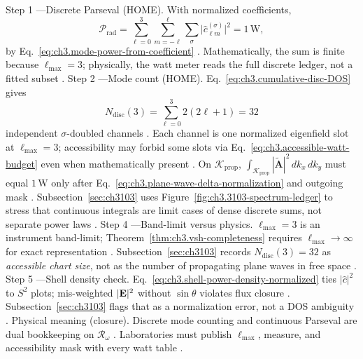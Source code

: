 Step 1 ---Discrete Parseval (HOME). With normalized coefficients,
\begin{equation}
\label{eq:ch3.wp3103-parseval-discrete}
\mathcal{P}_{\mathrm{rad}}
=
\sum_{\ell=0}^{3}\sum_{m=-\ell}^{\ell}\sum_{\sigma}
\bigl|\widehat{c}_{\ell m}^{(\sigma)}\bigr|^{2}
=
1\,\mathrm{W},
\end{equation}
by Eq.~\eqref{eq:ch3.mode-power-from-coefficient} \cite{poynting1884}. Mathematically, the sum is finite because
\(\ell_{\max}=3\); physically, the watt meter reads the full discrete ledger, not a fitted subset \cite{stratton1941}.
Step 2 ---Mode count (HOME). Eq.~\eqref{eq:ch3.cumulative-disc-DOS} gives
\begin{equation}
\label{eq:ch3.wp3103-DOS-count}
N_{\mathrm{disc}}(3)
=
\sum_{\ell=0}^{3}2(2\ell+1)
=
32
\end{equation}
independent \(\sigma\)-doubled channels \cite{hansen1988}. Each channel is one normalized eigenfield slot at
\(\ell_{\max}=3\); accessibility may forbid some slots via Eq.~\eqref{eq:ch3.accessible-watt-budget} even when mathematically present
\cite{harrington2001}.
On \(\mathcal{K}_{\mathrm{prop}}\),
\(\int_{\mathcal{K}_{\mathrm{prop}}}|\widetilde{\mathbf{A}}|^{2}\,dk_{x}\,dk_{y}\) must equal \(1\,\mathrm{W}\) only after
Eq.~\eqref{eq:ch3.plane-wave-delta-normalization} and outgoing mask \cite{stratton1941}. Subsection~\ref{sec:ch3103}
uses Figure~\ref{fig:ch3.3103-spectrum-ledger} to stress that continuous integrals are limit cases of dense discrete sums, not separate power
laws \cite{hansen1988}.
Step 4 ---Band-limit versus physics. \(\ell_{\max}=3\) is an instrument band-limit; Theorem~\ref{thm:ch3.vsh-completeness} requires \(\ell_{\max}\to\infty\) for exact representation
\cite{kato1995}. Subsection~\ref{sec:ch3103} records \(N_{\mathrm{disc}}(3)=32\) as \emph{accessible chart size}, not as the number of
propagating plane waves in free space \cite{jackson1999}.
Step 5 ---Shell density check. Eq.~\eqref{eq:ch3.shell-power-density-normalized} ties \(|\widehat{c}|^{2}\) to \(S^{2}\) plots; mis-weighted \(|\mathbf{E}|^{2}\) without
\(\sin\theta\) violates flux closure \cite{stratton1941}. Subsection~\ref{sec:ch3103} flags that as a normalization
error, not a DOS ambiguity \cite{hansen1988}.
Physical meaning (closure). Discrete mode counting and continuous Parseval are dual bookkeeping on \(\mathcal{R}_\omega\) \cite{stratton1941}.
Laboratories must publish \(\ell_{\max}\), measure, and accessibility mask with every watt table \cite{harrington2001}.
